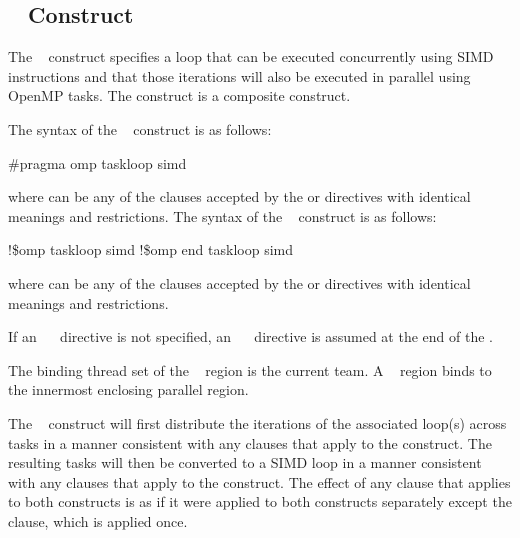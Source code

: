 %
%
\subsection{~ Construct}
\label{subsec:taskloop simd Construct}
\summary
The ~ construct specifies a loop that can be 
executed concurrently using SIMD instructions and that those iterations 
will also be executed in parallel using OpenMP tasks. The 
 construct is a composite construct.

\syntax
\ccppspecificstart
The syntax of the ~ construct is as follows:
\begin{boxedcode}
\#pragma omp taskloop simd 
\end{boxedcode}
where  can be any of the clauses accepted by the  or  directives with identical meanings and restrictions.
\ccppspecificend
\fortranspecificstart
The syntax of the ~ construct is as follows:
\begin{boxedcode}
!\$omp taskloop simd 
\plc{[}!\$omp end taskloop simd\plc{]}
\end{boxedcode}
where  can be any of the clauses accepted by the  or  directives with identical meanings and restrictions.

If an ~~ directive is not specified, an ~~ directive is assumed at the end of the .
\fortranspecificend

\binding
The binding thread set of the ~ region is the current team. A ~ region binds to the innermost enclosing parallel region.

\descr
The ~ construct will first distribute the iterations of the associated loop(s) across tasks in a manner consistent with any clauses that apply to the  construct. The resulting tasks will then be converted to a SIMD loop in a manner consistent with any clauses that apply to the  construct. The effect of any clause that applies to both constructs is as if it were applied to both constructs separately except the  clause, which is applied once.

